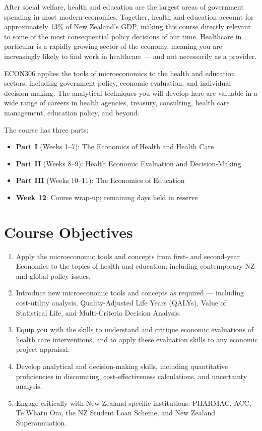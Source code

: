 \documentclass[11pt, a4paper]{article}
\begin{document}
After social welfare, health and education are the largest areas of government spending in most modern economies. Together, health and education account for approximately 13\% of New Zealand's GDP, making this course directly relevant to some of the most consequential policy decisions of our time. Healthcare in particular is a rapidly growing sector of the economy, meaning you are increasingly likely to find work in healthcare — and not necessarily as a provider.

ECON306 applies the tools of microeconomics to the health and education sectors, including government policy, economic evaluation, and individual decision-making. The analytical techniques you will develop here are valuable in a wide range of careers in health agencies, treasury, consulting, health care management, education policy, and beyond.

The course has three parts:
\begin{itemize}
  \item \textbf{Part I} (Weeks 1--7): The Economics of Health and Health Care
  \item \textbf{Part II} (Weeks 8--9): Health Economic Evaluation and Decision-Making
  \item \textbf{Part III} (Weeks 10--11): The Economics of Education
  \item \textbf{Week 12}: Course wrap-up; remaining days held in reserve
\end{itemize}

\section{Course Objectives}

\begin{enumerate}
  \item Apply the microeconomic tools and concepts from first- and second-year Economics to the topics of health and education, including contemporary NZ and global policy issues.
  \item Introduce new microeconomic tools and concepts as required — including cost-utility analysis, Quality-Adjusted Life Years (QALYs), Value of Statistical Life, and Multi-Criteria Decision Analysis.
  \item Equip you with the skills to understand and critique economic evaluations of health care interventions, and to apply these evaluation skills to any economic project appraisal.
  \item Develop analytical and decision-making skills, including quantitative proficiencies in discounting, cost-effectiveness calculations, and uncertainty analysis.
  \item Engage critically with New Zealand-specific institutions: PHARMAC, ACC, Te Whatu Ora, the NZ Student Loan Scheme, and New Zealand Superannuation.
\end{enumerate}
\end{document}
